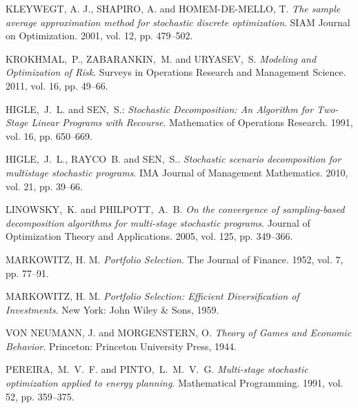 \documentclass{article}              %
\newcommand{\refauthor}[1]{\uppercase{#1}}
\newcommand{\reftitle}[1]{\emph{#1}}
\newcommand{\refyear}[1]{#1}
\newcommand{\refvolume}[1]{vol. #1}
\newcommand{\refissue}[1]{iss. #1}
\newcommand{\refjournal}[1]{#1}
\newcommand{\refpages}[1]{pp. #1}
\newcommand{\refpublisher}[1]{#1}
\begin{document}
\begin{thebibliography}{99}
 \refauthor{Kleywegt, A. J.}, \refauthor{Shapiro, A.} and \refauthor{Homem-de-Mello, T.} \reftitle{The sample average approximation method for stochastic discrete optimization}. \refjournal{SIAM Journal on Optimization}. \refyear{2001}, \refvolume{12}, \refpages{479--502}.

\refauthor{Krokhmal,~P.}, \refauthor{Zabarankin,~M.} and \refauthor{Uryasev,~S.} \reftitle{Modeling and Optimization of Risk}. \refjournal{Surveys in Operations Research and Management Science}.  \refyear{2011}, \refvolume{16}, \refpages{49--66}.


\refauthor{Higle,~J.~L.} and \refauthor{Sen,~S.}: \reftitle{Stochastic Decomposition: An Algorithm for Two-Stage Linear Programs with Recourse}. \refjournal{Mathematics of Operations Research}. \refyear{1991}, \refvolume{16}, \refpages{650--669}. 

 \refauthor{Higle,~J.~L.}, \refauthor{Rayco~B.} and \refauthor{Sen,~S.}. \reftitle{Stochastic scenario decomposition for multistage stochastic programs}. \refjournal{IMA Journal of Management Mathematics}. \refyear{2010}, \refvolume{21}, 
\refpages{39--66}.

\refauthor{Linowsky,~K.} and \refauthor{Philpott,~A.~B.} \reftitle{On the convergence of sampling-based decomposition algorithms for multi-stage stochastic programs}. \refjournal{Journal of Optimization Theory and Applications}.  \refyear{2005},  \refvolume{125}, \refpages{349--366}.


\refauthor{Markowitz, H. M.} \reftitle{Portfolio Selection}. \refjournal{The Journal of Finance}. \refyear{1952}, \refvolume{7}, \refpages{77--91}.

\refauthor{Markowitz, H. M.} \reftitle{Portfolio Selection: Efficient Diversification of Investments}. New York: \refpublisher{John Wiley \& Sons}, \refyear{1959}.

\refauthor{von Neumann, J.} and \refauthor{Morgenstern, O.} \reftitle{Theory of Games and Economic Behavior}. Princeton: \refpublisher{Princeton University Press}, \refyear{1944}.

 \refauthor{Pereira,~M.~V.~F.} and \refauthor{Pinto,~L.~M.~V.~G.} \reftitle{Multi-stage stochastic optimization applied to energy planning}. \refjournal{Mathematical Programming}. \refyear{1991}, \refvolume{52}, \refpages{359--375}.


\end{thebibliography}
\end{document}
